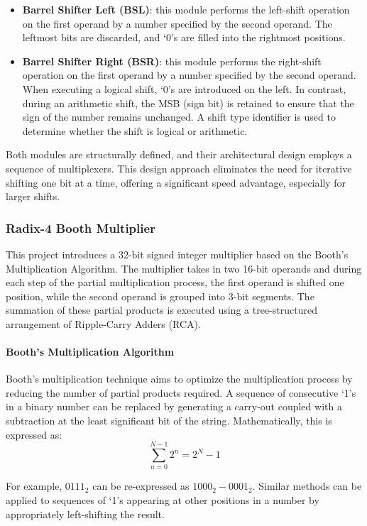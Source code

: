 \begin{itemize}
    \item \textbf{Barrel Shifter Left (BSL)}: this module performs the left-shift operation on the first operand by a number specified by the second operand. The leftmost bits are discarded, and `0's are filled into the rightmost positions.
    
    \item \textbf{Barrel Shifter Right (BSR)}: this module performs the right-shift operation on the first operand by a number specified by the second operand. When executing a logical shift, `0's are introduced on the left. In contrast, during an arithmetic shift, the MSB (sign bit) is retained to ensure that the sign of the number remains unchanged. A shift type identifier is used to determine whether the shift is logical or arithmetic.
\end{itemize}

Both modules are structurally defined, and their architectural design employs a sequence of multiplexers. This design approach eliminates the need for iterative shifting one bit at a time, offering a significant speed advantage, especially for larger shifts.

\subsubsection{Radix-4 Booth Multiplier}
This project introduces a 32-bit signed integer multiplier based on the Booth's Multiplication Algorithm. The multiplier takes in two 16-bit operands and during each step of the partial multiplication process, the first operand is shifted one position, while the second operand is grouped into 3-bit segments. The summation of these partial products is executed using a tree-structured arrangement of Ripple-Carry Adders (RCA).

\paragraph{Booth's Multiplication Algorithm}
Booth's multiplication technique aims to optimize the multiplication process by reducing the number of partial products required. A sequence of consecutive `1's in a binary number can be replaced by generating a carry-out coupled with a subtraction at the least significant bit of the string. Mathematically, this is expressed as:
\[
\sum_{n=0}^{N-1} 2^n = 2^N - 1
\]

For example, \(0111_2\) can be re-expressed as \(1000_2 - 0001_2\). Similar methods can be applied to sequences of `1's appearing at other positions in a number by appropriately left-shifting the result.  \\

